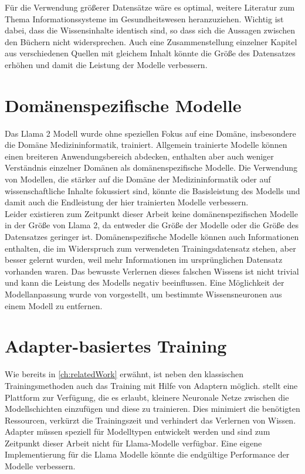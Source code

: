 Für die Verwendung größerer Datensätze wäre es optimal, weitere Literatur zum Thema Informationssysteme im Gesundheitswesen heranzuziehen.
Wichtig ist dabei, dass die Wissensinhalte identisch sind, so dass sich die Aussagen zwischen den Büchern nicht widersprechen.
Auch eine Zusammenstellung einzelner Kapitel aus verschiedenen Quellen mit gleichem Inhalt könnte die Größe des Datensatzes erhöhen und damit die Leistung der Modelle verbessern.\\

\section{Domänenspezifische Modelle}
Das Llama 2 Modell wurde ohne speziellen Fokus auf eine Domäne, insbesondere die Domäne Medizininformatik, trainiert.
Allgemein trainierte Modelle können einen breiteren Anwendungsbereich abdecken, enthalten aber auch weniger Verständnis einzelner Domänen als domänenspezifische Modelle.
Die Verwendung von Modellen, die stärker auf die Domäne der Medizininformatik oder auf wissenschaftliche Inhalte fokussiert sind, könnte die Basisleistung des Modells und damit auch die Endleistung der hier trainierten Modelle verbessern.\\

Leider existieren zum Zeitpunkt dieser Arbeit keine domänenspezifischen Modelle in der Größe von Llama 2, da entweder die Größe der Modelle oder die Größe des Datensatzes geringer ist.
Domänenspezifische Modelle können auch Informationen enthalten, die im Widerspruch zum verwendeten Trainingsdatensatz stehen, aber besser gelernt wurden, weil mehr Informationen im ursprünglichen Datensatz vorhanden waren.
Das bewusste Verlernen dieses falschen Wissens ist nicht trivial und kann die Leistung des Modells negativ beeinflussen.
Eine Möglichkeit der Modellanpassung wurde von \citet{knowledge_neurons} vorgestellt, um bestimmte Wissensneuronen aus einem Modell zu entfernen.

\section{Adapter-basiertes Training}\label{sec:adapter-training}
Wie bereits in \cref{ch:relatedWork} erwähnt, ist neben den klassischen Trainingsmethoden auch das Training mit Hilfe von Adaptern möglich.
\citet{adapterhub} stellt eine Plattform zur Verfügung, die es erlaubt, kleinere Neuronale Netze zwischen die Modellschichten einzufügen und diese zu trainieren.
Dies minimiert die benötigten Ressourcen, verkürzt die Trainingszeit und verhindert das Verlernen von Wissen.
Adapter müssen speziell für Modelltypen entwickelt werden und sind zum Zeitpunkt dieser Arbeit nicht für Llama-Modelle verfügbar.
Eine eigene Implementierung für die Llama Modelle könnte die endgültige Performance der Modelle verbessern.\\

